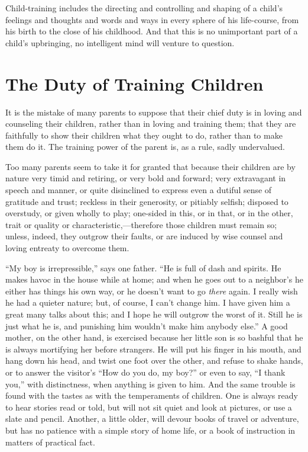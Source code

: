 \documentclass[
]{book}
\begin{document}
Child-training includes the directing and controlling and shaping of a child's feelings and thoughts and words and ways in every sphere of his life-course, from his birth to the close of his childhood. And that this is no unimportant part of a child's upbringing, no intelligent mind will venture to question.

\hypertarget{the-duty-of-training-children}{%
\chapter{The Duty of Training Children}\label{the-duty-of-training-children}}

It is the mistake of many parents to suppose that their chief duty is in loving and counseling their children, rather than in loving and training them; that they are faithfully to show their children what they ought to do, rather than to make them do it. The training power of the parent is, as a rule, sadly undervalued.

Too many parents seem to take it for granted that because their children are by nature very timid and retiring, or very bold and forward; very extravagant in speech and manner, or quite disinclined to express even a dutiful sense of gratitude and trust; reckless in their generosity, or pitiably selfish; disposed to overstudy, or given wholly to play; one-sided in this, or in that, or in the other, trait or quality or characteristic,---therefore those children must remain so; unless, indeed, they outgrow their faults, or are induced by wise counsel and loving entreaty to overcome them.

``My boy is irrepressible,'' says one father. ``He is full of dash and spirits. He makes havoc in the house while at home; and when he goes out to a neighbor's he either has things his own way, or he doesn't want to go \emph{there} again. I really wish he had a quieter nature; but, of course, I can't change him. I have given him a great many talks about this; and I hope he will outgrow the worst of it. Still he is just what he is, and punishing him wouldn't make him anybody else.'' A good mother, on the other hand, is exercised because her little son is so bashful that he is always mortifying her before strangers. He will put his finger in his mouth, and hang down his head, and twist one foot over the other, and refuse to shake hands, or to answer the visitor's ``How do you do, my boy?'' or even to say, ``I thank you,'' with distinctness, when anything is given to him. And the same trouble is found with the tastes as with the temperaments of children. One is always ready to hear stories read or told, but will not sit quiet and look at pictures, or use a slate and pencil. Another, a little older, will devour books of travel or adventure, but has no patience with a simple story of home life, or a book of instruction in matters of practical fact.
\end{document}
